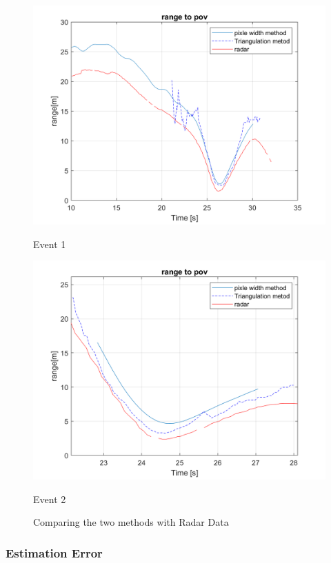 \begin{figure}[H]
\begin{minipage}[b]{0.49\textwidth}
    \includegraphics[width=\textwidth]{FiguresMat/homography_compare_long_10794257.png}
    \caption*{Event 1}
\end{minipage}
\begin{minipage}[b]{0.50\textwidth}
    \includegraphics[width=\textwidth]{FiguresMat/homography_compare_long_116147345.png}
    \caption*{Event 2}
\end{minipage}
\caption{Comparing the two methods with Radar Data}
\label{fig:triangulation_comparison_range}
\end{figure}

\subsubsection{Estimation Error}

